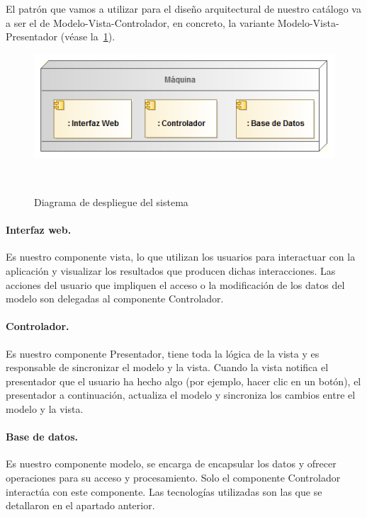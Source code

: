 El patrón que vamos a utilizar para el diseño arquitectural de nuestro 
catálogo va a ser el de Modelo-Vista-Controlador, en concreto, la variante Modelo-Vista-Presentador (véase la~\cref{fig:diagDespliegue}).

\vspace{.2cm}
\begin{figure}[ht]
	\centerline{\includegraphics[scale=0.6]{img/diagrama_despliegue}}\
	\caption{Diagrama de despliegue del sistema}
	\label{fig:diagDespliegue}
\end{figure}


\paragraph{Interfaz web.} Es nuestro componente vista, lo que utilizan los usuarios para 
interactuar con la aplicación y visualizar los resultados que producen dichas
interacciones. Las acciones del usuario que impliquen el acceso o la modificación
de los datos del modelo son delegadas al componente Controlador.

\paragraph{Controlador.} Es nuestro componente Presentador, tiene toda la lógica de la vista 
y es responsable de sincronizar el modelo y la vista. Cuando la vista notifica el 
presentador que el usuario ha hecho algo (por ejemplo, hacer clic en un botón), 
el presentador a continuación, actualiza el modelo y sincroniza los cambios 
entre el modelo y la vista.

\paragraph{Base de datos.} Es nuestro componente modelo, se encarga de encapsular 
los datos y ofrecer operaciones para su acceso y procesamiento. Solo el componente
Controlador interactúa con este componente.\newline\newline
Las tecnologías utilizadas son las que se detallaron en el apartado anterior.